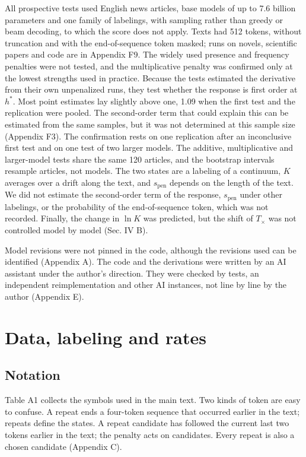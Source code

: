 \documentclass[aps,prx,onecolumn,superscriptaddress,longbibliography]{revtex4-2}
\begin{document}
All prospective tests used English news articles, base models of up to 7.6 billion parameters and one family of labelings, with sampling rather than greedy or beam decoding, to which the score does not apply. Texts had 512 tokens, without truncation and with the end-of-sequence token masked; runs on novels, scientific papers and code are in Appendix F9. The widely used presence and frequency penalties were not tested, and the multiplicative penalty was confirmed only at the lowest strengths used in practice. Because the tests estimated the derivative from their own unpenalized runs, they test whether the response is first order at \(h^*\). Most point estimates lay slightly above one, 1.09 when the first test and the replication were pooled. The second-order term that could explain this can be estimated from the same samples, but it was not determined at this sample size (Appendix F3). The confirmation rests on one replication after an inconclusive first test and on one test of two larger models. The additive, multiplicative and larger-model tests share the same 120 articles, and the bootstrap intervals resample articles, not models. The two states are a labeling of a continuum, \(K\) averages over a drift along the text, and \(s_{\mathrm{pen}}\) depends on the length of the text. We did not estimate the second-order term of the response, \(s_{\mathrm{pen}}\) under other labelings, or the probability of the end-of-sequence token, which was not recorded. Finally, the change in \(\ln K\) was predicted, but the shift of \(T_{\times}\) was not controlled model by model (Sec. IV B).

Model revisions were not pinned in the code, although the revisions used can be identified (Appendix A). The code and the derivations were written by an AI assistant under the author's direction. They were checked by tests, an independent reimplementation and other AI instances, not line by line by the author (Appendix E).


\appendix


\section{Data, labeling and rates}

\subsection{Notation}

Table A1 collects the symbols used in the main text. Two kinds of token are easy to confuse. A repeat ends a four-token sequence that occurred earlier in the text; repeats define the states. A repeat candidate has followed the current last two tokens earlier in the text; the penalty acts on candidates. Every repeat is also a chosen candidate (Appendix C).
\end{document}
